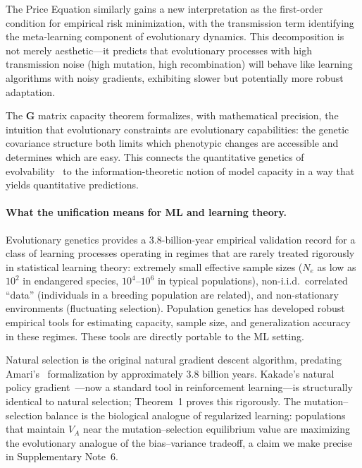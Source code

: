 \documentclass[12pt]{article}
\theoremstyle{remark}
\begin{document}
The Price Equation similarly gains a new interpretation as the first-order condition for empirical risk minimization, with the transmission term identifying the meta-learning component of evolutionary dynamics. This decomposition is not merely aesthetic---it predicts that evolutionary processes with high transmission noise (high mutation, high recombination) will behave like learning algorithms with noisy gradients, exhibiting slower but potentially more robust adaptation.

The $\mathbf{G}$ matrix capacity theorem formalizes, with mathematical precision, the intuition that evolutionary constraints are evolutionary capabilities: the genetic covariance structure both limits which phenotypic changes are accessible and determines which are easy. This connects the quantitative genetics of evolvability~\cite{houle1992,pigliucci2008} to the information-theoretic notion of model capacity in a way that yields quantitative predictions.

\paragraph{What the unification means for ML and learning theory.} Evolutionary genetics provides a 3.8-billion-year empirical validation record for a class of learning processes operating in regimes that are rarely treated rigorously in statistical learning theory: extremely small effective sample sizes ($N_e$ as low as $10^2$ in endangered species, $10^4$--$10^6$ in typical populations), non-i.i.d.\ correlated ``data'' (individuals in a breeding population are related), and non-stationary environments (fluctuating selection). Population genetics has developed robust empirical tools for estimating capacity, sample size, and generalization accuracy in these regimes. These tools are directly portable to the ML setting.

Natural selection is the original natural gradient descent algorithm, predating Amari's~\cite{amari1998} formalization by approximately 3.8 billion years. Kakade's natural policy gradient~\cite{kakade2001}---now a standard tool in reinforcement learning---is structurally identical to natural selection; Theorem~1 proves this rigorously. The mutation--selection balance is the biological analogue of regularized learning: populations that maintain $V_A$ near the mutation--selection equilibrium value are maximizing the evolutionary analogue of the bias--variance tradeoff, a claim we make precise in Supplementary Note~6.
\end{document}
